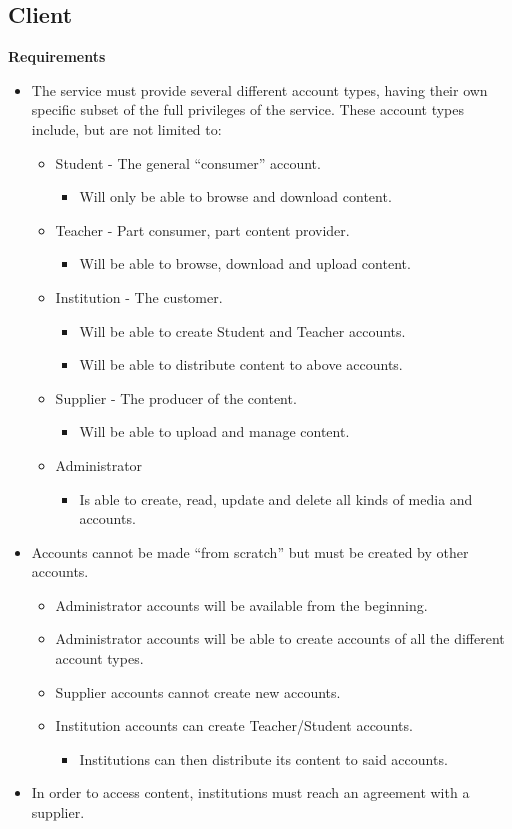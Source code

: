 \documentclass[10pt,a4paper]{article}
\begin{document}
\subsection{Client}
{\bfseries Requirements}\\
\begin{itemize}
\item The service must provide several different account types, having their own specific subset of the full privileges of the service. These account types include, but are not limited to:
\begin{itemize}
\item Student - The general “consumer” account.
\begin{itemize}
\item Will only be able to browse and download content.
\end{itemize}
\item Teacher - Part consumer, part content provider.
\begin{itemize}
\item Will be able to browse, download and upload content.
\end{itemize}
\item Institution - The customer.
\begin{itemize}
\item Will be able to create Student and Teacher accounts.
\item Will be able to distribute content to above accounts.
\end{itemize}
\item Supplier - The producer of the content.
\begin{itemize}
\item Will be able to upload and manage content.
\end{itemize}
\item Administrator
\begin{itemize}
\item Is able to create, read, update and delete all kinds of media and accounts.
\end{itemize}
\end{itemize}
\item Accounts cannot be made “from scratch” but must be created by other accounts.
\begin{itemize}
\item Administrator accounts will be available from the beginning.
\item Administrator accounts will be able to create accounts of all the different account types.
\item Supplier accounts cannot create new accounts.
\item Institution accounts can create Teacher/Student accounts.
\begin{itemize}
\item Institutions can then distribute its content to said accounts.
\end{itemize}
\end{itemize}
\item In order to access content, institutions must reach an agreement with a supplier.
\end{itemize}
\end{document}
